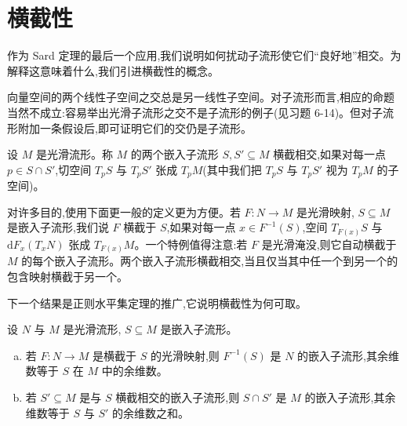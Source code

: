 \documentclass[../../main.tex]{subfiles}
\begin{document}
\section{横截性}\label{section:ch06-横截性}

作为 Sard 定理的最后一个应用,我们说明如何扰动子流形使它们``良好地''相交。为解释这意味着什么,我们引进横截性的概念。

向量空间的两个线性子空间之交总是另一线性子空间。对子流形而言,相应的命题当然不成立:容易举出光滑子流形之交不是子流形的例子(见习题 6-14)。但对子流形附加一条假设后,即可证明它们的交仍是子流形。

设 $M$ 是光滑流形。称 $M$ 的两个嵌入子流形 $S,S'\subseteq M$ 横截相交,如果对每一点 $p\in S\cap S'$,切空间 $T_pS$ 与 $T_pS'$ 张成 $T_pM$(其中我们把 $T_pS$ 与 $T_pS'$ 视为 $T_pM$ 的子空间)。

对许多目的,使用下面更一般的定义更为方便。若 $F:N\to M$ 是光滑映射, $S\subseteq M$ 是嵌入子流形,我们说 $F$ 横截于 $S$,如果对每一点 $x\in F^{-1}(S)$,空间 $T_{F(x)}S$ 与 $\mathrm{d}F_x(T_xN)$ 张成 $T_{F(x)}M$。一个特例值得注意:若 $F$ 是光滑淹没,则它自动横截于 $M$ 的每个嵌入子流形。两个嵌入子流形横截相交,当且仅当其中任一个到另一个的包含映射横截于另一个。

下一个结果是正则水平集定理的推广,它说明横截性为何可取。

\begin{theorem}\label{theorem:ch06-transverse}
设 $N$ 与 $M$ 是光滑流形, $S\subseteq M$ 是嵌入子流形。
\begin{enumerate}[(a)]
\item 若 $F:N\to M$ 是横截于 $S$ 的光滑映射,则 $F^{-1}(S)$ 是 $N$ 的嵌入子流形,其余维数等于 $S$ 在 $M$ 中的余维数。
\item 若 $S'\subseteq M$ 是与 $S$ 横截相交的嵌入子流形,则 $S\cap S'$ 是 $M$ 的嵌入子流形,其余维数等于 $S$ 与 $S'$ 的余维数之和。
\end{enumerate}
\end{theorem}
\end{document}
